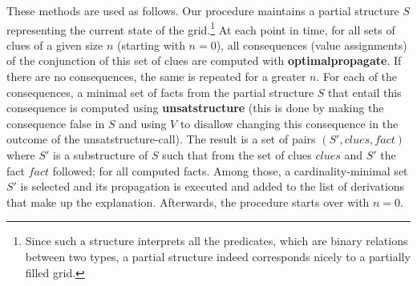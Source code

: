 These methods are used as follows. Our procedure maintains a partial structure $S$ representing the current state of the grid.\footnote{Since such a structure interprets all the predicates, which are binary relations between two types, a partial structure indeed corresponds nicely to a partially filled grid.} 
At each point in time, for all sets of clues of a given size $n$ (starting with $n=0$), all consequences (value assignments) of the conjunction of this set of clues are computed with \textbf{optimalpropagate}. 
If there are no consequences, the same is repeated for a greater $n$. 
For each of the consequences, a minimal set of facts from the partial structure $S$ that entail this consequence is computed using \textbf{unsatstructure} (this is done by making the consequence false in $S$ and using $V$ to disallow changing this consequence in the outcome of the unsatstructure-call). 
The result is a set of pairs $(S',\mathit{clues},\mathit{fact})$ where $S'$ is a substructure of $S$ such that from the set of clues $\mathit{clues}$ and $S'$ the fact $\mathit{fact}$ followed; for all computed facts.  %
Among those, a cardinality-minimal set $S'$ is selected and its propagation is executed and added to the list of derivations that make up the explanation.
Afterwards, the procedure starts over with $n=0$. 


